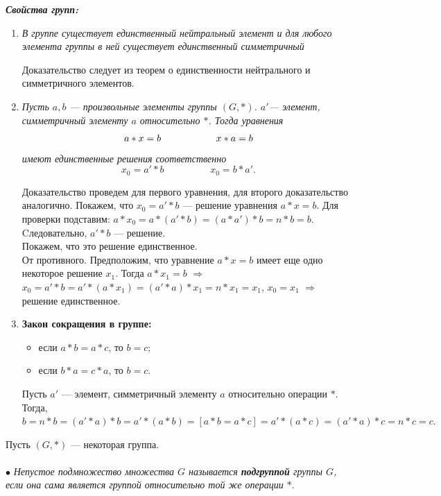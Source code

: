 \textbf{\textit{Свойства групп:}}\begin{enumerate}
	\item \textit{В группе существует единственный нейтральный элемент и для любого элемента группы в ней существует единственный симметричный}
	\begin{Proof} Доказательство следует из теорем о единственности нейтрального и
		симметричного элементов. \end{Proof}
	\item \textit{Пусть $a, b$ --- произвольные элементы группы $(G, *)$. $a'$--- элемент, симметричный элементу $a$ относительно $*$. Тогда уравнения}
	$$a * x = b \hspace{2 cm} x*a = b$$
	\textit{имеют единственные решения соответственно $$x_0 = a' * b\hspace{2cm} x_0 = b * a'.$$}
	\begin{Proof} Доказательство проведем для первого уравнения, для второго доказательство аналогично.
		Покажем, что $x_0 = a' * b$ --- решение уравнения $a * x = b$. Для проверки подставим: $a * x_0 = a * (a' * b) = (a * a') * b = n * b = b$. Cледовательно, $a' * b$ --- решение. \\
		Покажем, что это решение единственное. \\
		От противного. Предположим, что уравнение $a * x = b$ имеет еще одно некоторое решение $x_1$. Тогда 
		$a * x_1 = b$ $\Rightarrow$ $x_0 = a' * b = a' * (a * x_1) = (a' * a) * x_1 = n * x_1 = x_1$, $x_0 = x_1$ $\Rightarrow$ решение единственное.
	\end{Proof}
	\item \textbf{Закон сокращения в группе:}\begin{itemize}
		\item если $a * b = a * c$, то $b = c$;
		\item если $b * a = c * a$, то $b = c$.
	\end{itemize}
	\begin{Proof} Пусть $a'$ --- элемент, симметричный элементу $a$ относительно операции $*$. Тогда, $b = n * b = (a' * a) * b = a' * (a * b) = [ a*b = a*c ] = a' * (a * c) = (a' * a) * c = n * c = c.$ \end{Proof}
\end{enumerate}
Пусть $(G, *)$ --- некоторая группа.\\\\
$\bullet$ \textit{Непустое подмножество множества $G$ называется \textbf{подгруппой} группы $G$, если она сама является группой относительно той же операции $*$}.
